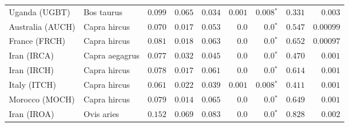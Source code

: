 \begin{center}
\begin{adjustbox}{width = 1\textwidth}
\begin{tabular}{|l|l|r|r|r|r|r|r|r|}
                  Uganda (UGBT) &           Bos taurus &                                        $ 0.099$ &                                           $ 0.065$ &                      $ 0.034$ &         $ 0.001$ &               $\bm{ 0.008{^*}}$ &                                           $ 0.331$ &           $ 0.003$ \\
               Australia (AUCH) &         Capra hircus &                                        $ 0.070$ &                                           $ 0.017$ &                      $ 0.053$ &            $0.0$ &                  $\bm{0.0{^*}}$ &                                           $ 0.547$ &          $0.00099$ \\
                  France (FRCH) &         Capra hircus &                                        $ 0.081$ &                                           $ 0.018$ &                      $ 0.063$ &            $0.0$ &                  $\bm{0.0{^*}}$ &                                           $ 0.652$ &          $0.00097$ \\
                    Iran (IRCA) &       Capra aegagrus &                                        $ 0.077$ &                                           $ 0.032$ &                      $ 0.045$ &            $0.0$ &                  $\bm{0.0{^*}}$ &                                           $ 0.470$ &           $ 0.001$ \\
                    Iran (IRCH) &         Capra hircus &                                        $ 0.078$ &                                           $ 0.017$ &                      $ 0.061$ &            $0.0$ &                  $\bm{0.0{^*}}$ &                                           $ 0.614$ &           $ 0.001$ \\
                   Italy (ITCH) &         Capra hircus &                                        $ 0.061$ &                                           $ 0.022$ &                      $ 0.039$ &         $ 0.001$ &               $\bm{ 0.008{^*}}$ &                                           $ 0.411$ &           $ 0.001$ \\
                 Morocco (MOCH) &         Capra hircus &                                        $ 0.079$ &                                           $ 0.014$ &                      $ 0.065$ &            $0.0$ &                  $\bm{0.0{^*}}$ &                                           $ 0.649$ &           $ 0.001$ \\
                    Iran (IROA) &           Ovis aries &                                        $ 0.152$ &                                           $ 0.069$ &                      $ 0.083$ &            $0.0$ &                  $\bm{0.0{^*}}$ &                                           $ 0.828$ &           $ 0.002$ \\

\end{tabular}
\end{adjustbox}
\end{center}
